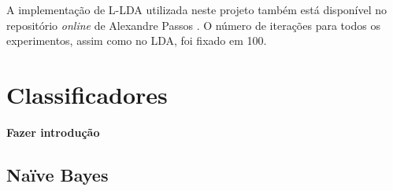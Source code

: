 
A implementação de L-LDA utilizada neste projeto também está disponível no repositório \emph{online} de Alexandre Passos \cite{top-llda}. O número de iterações para todos os experimentos, assim como no LDA, foi fixado em 100.








\section{Classificadores}

\textbf{Fazer introdução}

\subsection{Naïve Bayes}
\label{subsection:bayes}

